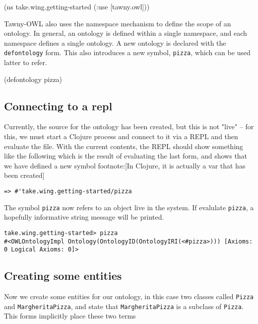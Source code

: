 \documentclass[11pt]{article}
\begin{document}
\begin{tawny}
(ns take.wing.getting-started (:use [tawny.owl]))
\end{tawny}

Tawny-OWL also uses the namespace mechanism to define the scope of an
ontology. In general, an ontology is defined within a single namespace,
and each namespace defines a single ontology. A new ontology is declared
with the \texttt{defontology} form. This also introduces a new symbol, \texttt{pizza},
which can be used latter to refer.

\begin{tawny}
(defontology pizza)
\end{tawny}


\subsection{Connecting to a repl}
\label{sec-4-3}

Currently, the source for the ontology has been created, but this is not
"live" -- for this, we must start a Clojure process and connect to it
via a REPL and then evaluate the file. With the current contents, the
REPL should show something like the following which is the result of
evaluating the last form, and shows that we have defined a new symbol
footnote:[In Clojure, it is actually a var that has been created]

\begin{verbatim}
=> #'take.wing.getting-started/pizza
\end{verbatim}

The symbol \texttt{pizza} now refers to an object live in the system. If
evalulate \texttt{pizza}, a hopefully informative string message will be
printed.


\begin{verbatim}
take.wing.getting-started> pizza
#<OWLOntologyImpl Ontology(OntologyID(OntologyIRI(<#pizza>))) [Axioms: 0 Logical Axioms: 0]>
\end{verbatim}

\subsection{Creating some entities}
\label{sec-4-4}

Now we create some entities for our ontology, in this case two classes
called \texttt{Pizza} and \texttt{MargheritaPizza}, and state that \texttt{MargheritaPizza}
is a subclass of \texttt{Pizza}. This forms implicitly place these two terms
\end{document}
